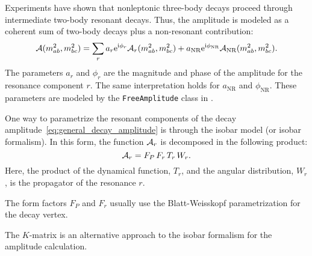 Experiments have shown that nonleptonic three-body decays proceed through intermediate two-body resonant decays.
Thus, the amplitude is modeled as a coherent sum of two-body decays plus a non-resonant contribution:
\begin{equation}\label{eq:general_decay_amplitude}
    \mathcal{A}(m_{ab}^2, m_{bc}^2) = \sum_r a_r \mathrm{e}^{\mathrm{i}\phi_r}\mathcal{A}_r(m_{ab}^2,m_{bc}^2)
    + a_{\textup{NR}} \mathrm{e}^{\mathrm{i} \phi_{\textup{NR}}} \mathcal{A}_{\textup{NR}}(m_{ab}^2,m_{bc}^2).
\end{equation}
The parameters $a_r$ and $\phi_r$ are the magnitude and phase of the amplitude for the resonance component $r$.
The same interpretation holds for $a_\text{NR}$ and $\phi_\text{NR}$.
These parameters are modeled by the \lstinline!FreeAmplitude! class in .


One way to parametrize the resonant components of the decay amplitude~\eqref{eq:general_decay_amplitude} is through the isobar model (or isobar formalism).
In this form, the function $\mathcal{A}_r$ is decomposed in the following product:
\begin{equation}
    \mathcal{A}_r = F_P\,F_r\, T_r\, W_r.
\end{equation}
Here, the product of the dynamical function, $T_r$, and the angular distribution, $W_r$, is the propagator of the resonance $r$.

The form factors $F_P$ and $F_r$ usually use the Blatt-Weisskopf parametrization for the decay vertex.

The $K$-matrix is an alternative approach to the isobar formalism for the amplitude calculation.
